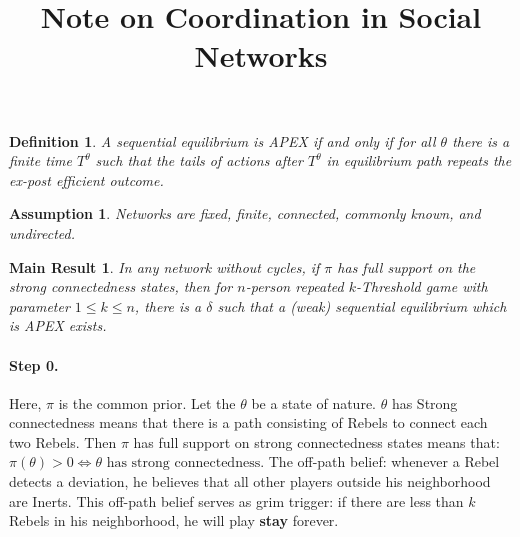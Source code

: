 \documentclass[12pt,letter]{article}
\newtheorem*{result}{Main Result}
\newtheorem*{definition}{Definition}
\newtheorem*{assumption}{Assumption}
\theoremstyle{definition}
\theoremstyle{remark}
\theoremstyle{claim}
\begin{document}

\title {Note on Coordination in Social Networks}


\maketitle

\begin{definition}
A sequential equilibrium is APEX if and only if for all $\theta$ there is a finite time $T^{\theta}$ such that the tails of actions after $T^{\theta}$ in equilibrium path repeats the ex-post efficient outcome.
\end{definition}

\begin{assumption}
Networks are fixed, finite, connected, commonly known, and undirected.
\end{assumption}

\begin{result}
In any network without cycles, if $\pi$ has full support on the strong connectedness states, then for $n$-person repeated $k$-Threshold game with parameter $1\leq k \leq n$, there is a $\delta$ such that a (weak) sequential equilibrium which is APEX exists.  
\end{result}

\paragraph{Step 0.}

Here, $\pi$ is the common prior. Let the $\theta$ be a state of nature. $\theta$ has {Strong connectedness} means that there is a path consisting of Rebels to connect each two Rebels. Then {$\pi$ has full support on strong connectedness states} means that: $\pi(\theta)>0 \Leftrightarrow \theta \text{ has strong connectedness}$. The {off-path belief}: whenever a Rebel detects a deviation, he believes that all other players outside his neighborhood are Inerts. This off-path belief serves as {grim trigger}: if there are less than $k$ Rebels in his neighborhood, he will play \textbf{stay} forever.
\end{document}
